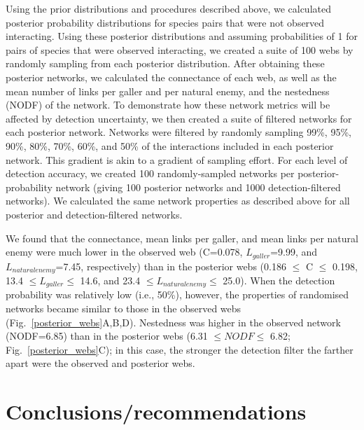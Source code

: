 \documentclass[12pt]{article}
\begin{document}
\begin{spacing}{2.0}
    Using the prior distributions and procedures described above, we calculated posterior probability distributions for species pairs that were not observed interacting. Using these posterior distributions and assuming probabilities of 1 for pairs of species that were observed interacting, we created a suite of 100 webs by randomly sampling from each posterior distribution. After obtaining these posterior networks, we calculated the connectance of each web, as well as the mean number of links per galler and per natural enemy, and the nestedness (NODF) of the network. To demonstrate how these network metrics will be affected by detection uncertainty, we then created a suite of filtered networks for each posterior network. Networks were filtered by randomly sampling 99\%, 95\%, 90\%, 80\%, 70\%, 60\%, and 50\% of the interactions included in each posterior network. This gradient is akin to a gradient of sampling effort. For each level of detection accuracy, we created 100 randomly-sampled networks per posterior-probability network (giving 100 posterior networks and 1000 detection-filtered networks). We calculated the same network properties as described above for all posterior and detection-filtered networks.


    We found that the connectance, mean links per galler, and mean links per natural enemy were much lower in the observed web (C=0.078, $L_{galler}$=9.99, and $L_{natural enemy}$=7.45, respectively) than in the posterior webs (0.186 $\leq$ C $\leq$ 0.198, 13.4 $\leq L_{galler} \leq$ 14.6, and 23.4 $\leq L_{natural enemy} \leq$ 25.0). When the detection probability was relatively low (i.e., 50\%), however, the properties of randomised networks became similar to those in the observed webs (Fig.~\ref{posterior_webs}A,B,D). Nestedness was higher in the observed network (NODF=6.85) than in the posterior webs (6.31 $\leq NODF \leq$ 6.82; Fig.~\ref{posterior_webs}C); in this case, the stronger the detection filter the farther apart were the observed and posterior webs. 


\section*{Conclusions/recommendations}


\end{spacing}
\end{document}
